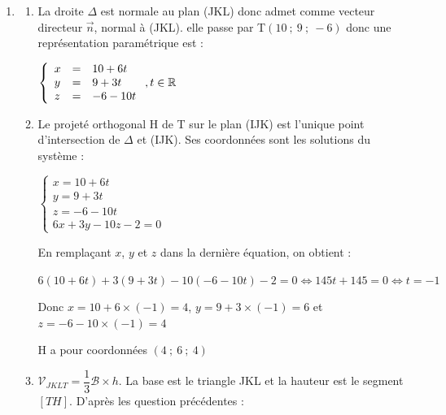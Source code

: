 \documentclass[10pt]{article}
\providecommand{\R}{\mathbb{R}}
\providecommand{\vect}[1]{\overrightarrow{#1}}
\begin{document}
\begin{enumerate}
\begin{enumerate}
$\left(\vect{JK}~,~\vect{JL}\right)$ est donc une base du plan (JKL).

Calculons :

$\vect{n}.\vect{JK}=6\times(-1)+3\times 2+(-10)\times 0=0$ et $\vect{n}.\vect{JL}=6\times(-4)+3\times (-2)+(-10)\times (-3)=0$.

Le vecteur $\vect{n}$ est donc orthogonal aux $\vect{JK}$ et $\vect{JL}$. C'est donc un vecteur normal au plan (JKL).
		\item Le plan (JKL) a pour équation cartésienne : $ax+by+cz+d=0$, où $(a~;~b~;~c)$ sont les cordonnées d'un vecteur normal au plan. En prenant comme vecteur normal le vecteur $\vect{n}$, on obtient : (JKL) : $6x + 3y - 10z + d = 0$. 

Or $J\in \text{(JKL)}$ donc $12+0-10+d=0$ donc $d=-2$. Donc (JKL) a pour équation 

$6x + 3y - 10z - 2 = 0$.
	\end{enumerate}
	\item
	\begin{enumerate}
		\item La droite $\Delta$ est normale au plan (JKL) donc admet comme vecteur directeur $\vect{n}$, normal à (JKL). elle passe par T$(10~;~9~;~-6)$ donc une représentation paramétrique est :
		
$\left\{\begin{array}{l c l}	x&=&10+6t\\y &=&9+3t\\z&=&-6-10t			\end{array}\right. , t \in \R$
		\item Le projeté orthogonal H de T sur le plan (IJK) est l'unique point d'intersection de $\Delta$ et (IJK). Ses coordonnées sont les solutions du système :

$\left\{\begin{array}{l}	x=10+6t\\y =9+3t\\z=-6-10t\\6x+3y-10z-2=0			\end{array}\right.$

En remplaçant $x$, $y$ et $z$ dans la dernière équation, on obtient :

$6(10+6t)+3(9+3t)-10(-6-10t)-2=0 \iff 145t+145=0 \iff t=-1$

Donc $x=10+6\times(-1)=4$, $y=9+3\times(-1)=6$ et $z=-6-10\times(-1)=4$

H a pour coordonnées $(4~;~6~;~4)$
\item $\mathcal{V}_{JKLT}  = \dfrac13 \mathcal{B} \times h$. La base est le triangle JKL et la hauteur est le segment $[TH]$. D'après les question précédentes :


\end{enumerate}
\end{enumerate}
\end{document}
